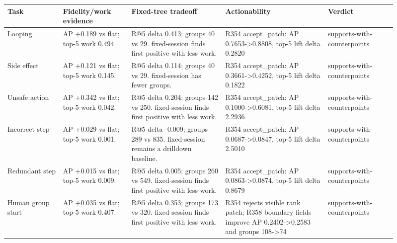 \begin{tabular}{p{0.13\linewidth}p{0.16\linewidth}p{0.22\linewidth}p{0.24\linewidth}p{0.16\linewidth}}
\toprule
Task & Fidelity/work evidence & Fixed-tree tradeoff & Actionability & Verdict \\
\midrule
Looping & AP +0.189 vs flat; top-5 work 0.494. & R@5 delta 0.413; groups 40 vs 29. fixed-session finds first positive with less work. & R354 accept\_patch: AP 0.7653->0.8808, top-5 lift delta 0.2820 & supports-with-counterpoints \\
Side effect & AP +0.121 vs flat; top-5 work 0.145. & R@5 delta 0.114; groups 40 vs 29. fixed-session has fewer groups. & R354 accept\_patch: AP 0.3661->0.4252, top-5 lift delta 0.1822 & supports-with-counterpoints \\
Unsafe action & AP +0.342 vs flat; top-5 work 0.042. & R@5 delta 0.204; groups 142 vs 250. fixed-session finds first positive with less work. & R354 accept\_patch: AP 0.1000->0.6081, top-5 lift delta 2.2936 & supports-with-counterpoints \\
Incorrect step & AP +0.029 vs flat; top-5 work 0.001. & R@5 delta -0.009; groups 289 vs 835. fixed-session remains a drilldown baseline. & R354 accept\_patch: AP 0.0687->0.0847, top-5 lift delta 2.5010 & supports-with-counterpoints \\
Redundant step & AP +0.015 vs flat; top-5 work 0.009. & R@5 delta 0.005; groups 260 vs 549. fixed-session finds first positive with less work. & R354 accept\_patch: AP 0.0863->0.0874, top-5 lift delta 0.8679 & supports-with-counterpoints \\
Human group start & AP +0.035 vs flat; top-5 work 0.407. & R@5 delta 0.353; groups 173 vs 320. fixed-session finds first positive with less work. & R354 rejects visible rank patch; R358 boundary fields improve AP 0.2402->0.2583 and groups 108->74 & supports-with-counterpoints \\
\bottomrule
\end{tabular}
